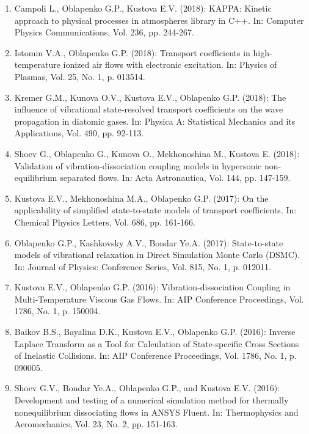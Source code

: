 \documentclass{resume} %
\begin{document}
\begin{enumerate}
\item {Campoli L., {Oblapenko G.P.}, Kustova E.V.} (2018): KAPPA: Kinetic approach to physical processes in atmospheres library in C++. In: Computer Physics Communications, Vol. 236, pp. 244-267.

\item {Istomin V.A., {Oblapenko G.P.}} (2018): Transport coefficients in high-temperature ionized air flows with electronic excitation. In: Physics of Plasmas, Vol. 25, No. 1, p. 013514.

\item {Kremer G.M., Kunova O.V., Kustova E.V., {Oblapenko G.P.}} (2018): The influence of vibrational state-resolved transport coefficients on the wave propagation in diatomic gases. In: Physica A: Statistical Mechanics and its Applications, Vol. 490, pp. 92-113.

\item {Shoev G., {Oblapenko G.}, Kunova O., Mekhonoshina M., Kustova E.} (2018): Validation of vibration-dissociation coupling models in hypersonic non-equilibrium separated flows. In: Acta Astronautica, Vol. 144, pp. 147-159.

\item {Kustova E.V., Mekhonoshina M.A., {Oblapenko G.P.}} (2017): On the applicability of simplified state-to-state models of transport coefficients. In: Chemical Physics Letters, Vol. 686, pp. 161-166.

\item {{Oblapenko G.P.}, Kashkovsky A.V., Bondar Ye.A.} (2017): State-to-state models of vibrational relaxation in Direct Simulation Monte Carlo (DSMC). In: Journal of Physics: Conference Series, Vol. 815, No. 1, p. 012011.

\item  {Kustova E.V., {Oblapenko G.P.}} (2016): Vibration-dissociation Coupling in Multi-Temperature Viscous Gas Flows. In: AIP Conference Proceedings, Vol. 1786, No. 1, p. 150004.

\item  {Baikov B.S., Bayalina D.K., Kustova E.V., {Oblapenko G.P.}} (2016): Inverse Laplace Transform as a Tool for Calculation of State-specific Cross Sections of Inelastic Collisions. In: AIP Conference Proceedings, Vol. 1786, No. 1, p. 090005.

\item  {Shoev G.V., Bondar Ye.A., {Oblapenko G.P.}, and Kustova E.V.} (2016): Development and testing of a numerical simulation method for thermally nonequilibrium dissociating flows in ANSYS Fluent. In: Thermophysics and Aeromechanics, Vol. 23, No. 2, pp. 151-163.


\end{enumerate}
\end{document}
